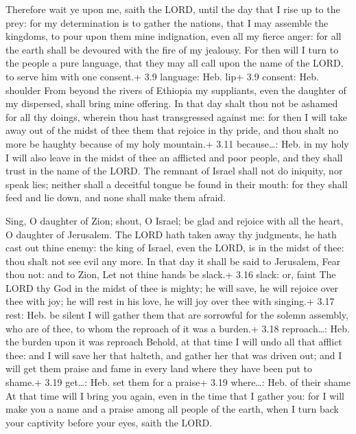  Therefore wait ye upon me, saith the LORD, until the day
that I rise up to the prey: for my determination is to gather the
nations, that I may assemble the kingdoms, to pour upon them mine
indignation, even all my fierce anger: for all the earth shall be
devoured with the fire of my jealousy.  For then will I turn
to the people a pure language, that they may all call upon the name of
the LORD, to serve him with one consent.+ 3.9 language: Heb. lip+ 3.9
consent: Heb. shoulder  From beyond the rivers of Ethiopia
my suppliants, even the daughter of my dispersed, shall bring mine
offering.  In that day shalt thou not be ashamed for all
thy doings, wherein thou hast transgressed against me: for then I will
take away out of the midst of thee them that rejoice in thy pride, and
thou shalt no more be haughty because of my holy mountain.+ 3.11
because\ldots: Heb. in my holy  I will also leave in the
midst of thee an afflicted and poor people, and they shall trust in the
name of the LORD.  The remnant of Israel shall not do
iniquity, nor speak lies; neither shall a deceitful tongue be found in
their mouth: for they shall feed and lie down, and none shall make them
afraid.

 Sing, O daughter of Zion; shout, O Israel; be glad and
rejoice with all the heart, O daughter of Jerusalem.  The
LORD hath taken away thy judgments, he hath cast out thine enemy: the
king of Israel, even the LORD, is in the midst of thee: thou shalt not
see evil any more.  In that day it shall be said to
Jerusalem, Fear thou not: and to Zion, Let not thine hands be slack.+
3.16 slack: or, faint  The LORD thy God in the midst of
thee is mighty; he will save, he will rejoice over thee with joy; he
will rest in his love, he will joy over thee with singing.+ 3.17 rest:
Heb. be silent  I will gather them that are sorrowful for
the solemn assembly, who are of thee, to whom the reproach of it was a
burden.+ 3.18 reproach\ldots: Heb. the burden upon it was reproach
 Behold, at that time I will undo all that afflict thee:
and I will save her that halteth, and gather her that was driven out;
and I will get them praise and fame in every land where they have been
put to shame.+ 3.19 get\ldots: Heb. set them for a praise+ 3.19
where\ldots: Heb. of their shame  At that time will I bring
you again, even in the time that I gather you: for I will make you a
name and a praise among all people of the earth, when I turn back your
captivity before your eyes, saith the LORD.

